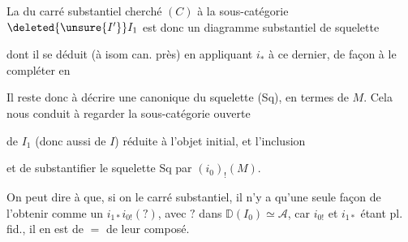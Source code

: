 La  du carré  substantiel cherché $(C)$ à la sous-catégorie $\deleted{\unsure{I'}}I_1$ est donc un diagramme substantiel de squelette


dont il se déduit (à isom can. près) en appliquant $i_*$ à ce dernier, de façon à le compléter en


Il reste donc à décrire une  canonique du squelette (Sq), en termes de $M$. Cela nous conduit à regarder la sous-catégorie ouverte


de $I_1$ (donc aussi de $I$) réduite à l'objet initial, et l'inclusion


et de  substantifier le squelette Sq par $(i_0)_!(M)$.

On peut dire à  que, si on  le carré substantiel, il n'y a  qu'une seule façon de l'obtenir comme un $i_{1*}i_{0!}(?)$, avec $?$ dans $\mathbb D(I_0)\simeq\mathcal A$, car $i_{0!}$ et $i_{1*}$ étant pl. fid., il en est de $=$ de leur composé. 
